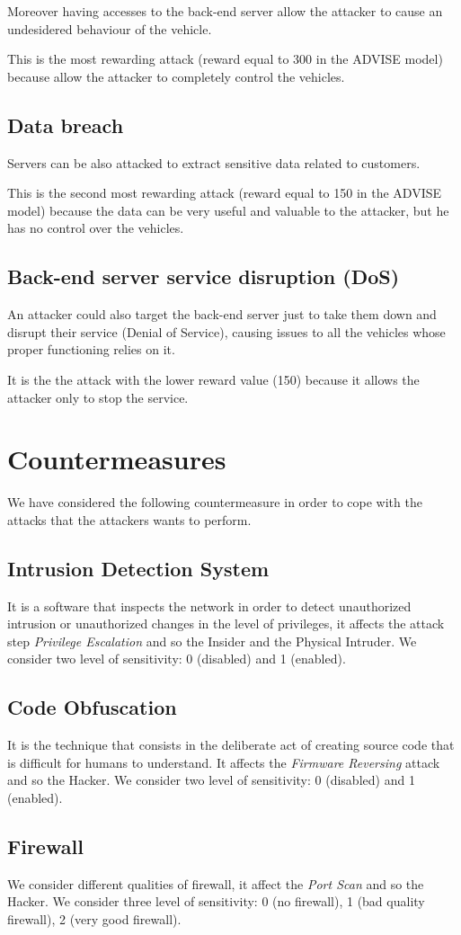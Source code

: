 \noindent Moreover having accesses to the back-end server allow the attacker to cause an undesidered behaviour of the vehicle.

\noindent This is the most rewarding attack (reward equal to 300 in the ADVISE model) because allow the attacker to completely control the vehicles.

\subsection*{Data breach}
Servers can be also attacked to extract sensitive data related to customers.

\noindent This is the second most rewarding attack (reward equal to 150 in the ADVISE model) because the data can be very useful and valuable to the attacker, but he has no control over the vehicles.

\subsection*{Back-end server service disruption (DoS)}
An attacker could also target the back-end server just to take them down and disrupt their service (Denial of Service), causing issues to all the vehicles whose proper functioning relies on it.

\noindent It is the the attack with the lower reward value (150) because it allows the attacker only to stop the service.

\section{Countermeasures}
\noindent We have considered the following countermeasure in order to cope with the attacks that the attackers wants to perform.

\subsection*{Intrusion Detection System}
\noindent It is a software that inspects the network in order to detect unauthorized intrusion or unauthorized changes in the level of privileges, it affects the attack step \textit{Privilege Escalation} and so the Insider and the Physical Intruder. We consider two level of sensitivity: 0 (disabled) and 1 (enabled).


\subsection*{Code Obfuscation}
\noindent It is the technique that consists in the deliberate act of creating source code that is difficult for humans to understand. It affects the \textit{Firmware Reversing} attack and so the Hacker. We consider two level of sensitivity: 0 (disabled) and 1 (enabled).

\subsection*{Firewall}
\noindent We consider different qualities of firewall, it affect the \textit{Port Scan} and so the Hacker. We consider three level of sensitivity: 0 (no firewall), 1 (bad quality firewall), 2 (very good firewall).



